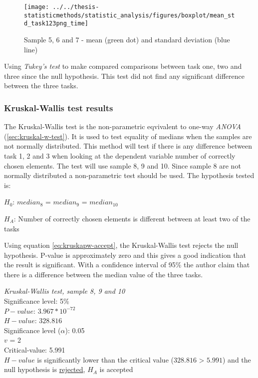 \begin{figure}[h!]
	\centering
	\texttt{[image: ../../thesis-statisticmethods/statistic\_analysis/figures/boxplot/mean\_std\_task123png\_time]}
	\caption{Sample 5, 6 and 7 - mean (green dot) and standard deviation (blue line)}
	\label{fig:meanstdtask123pngtime}
\end{figure}

Using \textit{Tukey's test} to make compared comparisons between task one, two and three since the null hypothesis. This test did not find any significant difference between the three tasks. 

\subsubsection{Kruskal-Wallis test results}

The Kruskal-Wallis test is the non-parametric eqvivalent to one-way \textit{ANOVA} (\ref{sec:kruskal-w-test}). It is used to test equality of medians when the samples are not normally distributed. This method will test if there is any difference between task 1, 2 and 3 when looking at the dependent variable number of correctly chosen elements. The test will use sample 8, 9 and 10. Since sample 8 are not normally distributed a non-parametric test should be used. The hypothesis tested is: \\[0.2cm]

\centerline{$H_{0}$: $median_8$ = $median_9$ = $median_10$}
\centerline{$H_{A}$: Number of correctly chosen elements is different between at least two of the tasks}

Using equation \ref{eq:kruskapw-accept}, the Kruskal-Wallis test rejects the null hypothesis. P-value is approximately zero and this gives a good indication that the result is significant. With a confidence interval of 95\% the author claim that there is a difference between the median value of the three tasks. \\[0.2cm]

 \begin{center}
	\begin{tcolorbox}[box align=center,width=\textwidth-5cm]
		\centering
		\textit{Kruskal-Wallis test, sample 8, 9 and 10}\\
		Significance level: 5\%  \\[0.5cm]
		
		$P-value$: $3.967* 10^{-72}$ \\
		$H-value$: $328.816$ \\
		Significance level ($\alpha$): 0.05 \\
		$v$ = 2\\ %
		Critical-value:  5.991\\[0.2cm] %
		
		$H-value$ is significantly lower than the critical value ($328.816$ > $5.991$) and the null hypothesis is \underline{rejected}, $H_A$ is accepted\\[0.5cm]
	\end{tcolorbox} 
\end{center}

